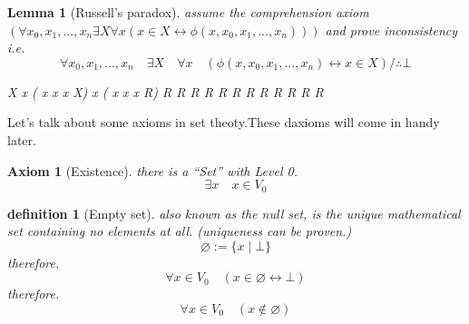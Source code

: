 \documentclass[10pt,a4paper]{book}
\let\emptyset\varnothing
\newtheorem{definition}{definition}[section]
\newtheorem{lemma}{Lemma}[section]
\newtheorem{axiom}{Axiom}[section]
\begin{document}
\begin{lemma}[Russell's paradox] assume the comprehension axiom $( \forall x_0 , x_1, ... , x_n \exists X \forall x  ( x \in X \leftrightarrow \phi (x,x_0 , x_1, ... , x_n)  ) )$
    and prove inconsistency i.e.
    \[  \forall x_0 , x_1, ... , x_n \quad \exists X \quad \forall x \quad ( \phi (x,x_0 , x_1, ... , x_n) \leftrightarrow x \in X) /\therefore \bot\]

    \begin{fitchproof}[arrayenv=tabular]
         {\exists X \forall x  ( x \notin  x  \leftrightarrow x \in X)}                                
        \open
         { \forall x  ( x \notin  x  \leftrightarrow x \in R)}                                
         {    R \notin  R  \leftrightarrow R \in R}                                
        \open
         {     R \in R}                                
         {    R \notin  R  }                                
         {    \bot }                                
        \close
         {    R \notin  R  }                                
         {     R \in R}                                
         {    \bot }                                
        \close
         {\bot}                                          

    \end{fitchproof}
\end{lemma}



Let's talk about some axioms in set theoty.These daxioms will come in handy
later.

\begin{axiom}
    [Existence] there is a ``Set'' with Level 0.
    \[ \exists x  \quad x \in V_0 \]
\end{axiom}

\begin{definition}
    [Empty set] also known as the null set,
    is the unique mathematical set containing no elements at all.
    (uniqueness can be proven.)
    \[ \emptyset:=\{x \mid \bot\} \]
    therefore.
    \[ \forall x \in V_0 \quad (x \in \emptyset \leftrightarrow  \bot  ) \]
    therefore.
    \[ \forall x \in V_0 \quad  (x \notin \emptyset ) \]
\end{definition}
\end{document}
